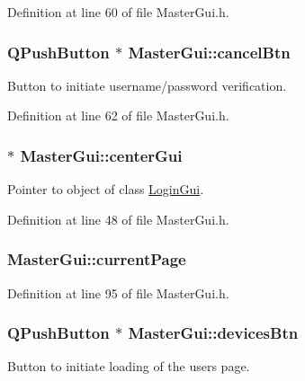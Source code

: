 Definition at line 60 of file Master\-Gui.\-h.

\hypertarget{class_master_gui_a9203da9daf3fa1294c744bc7fa645115}{
\subsubsection[{cancel\-Btn}]{\setlength{\rightskip}{0pt plus 5cm}Q\-Push\-Button $\ast$ Master\-Gui\-::cancel\-Btn\hspace{0.3cm}{\ttfamily [private]}}}\label{class_master_gui_a9203da9daf3fa1294c744bc7fa645115}
Button to initiate username/password verification. 

Definition at line 62 of file Master\-Gui.\-h.

\hypertarget{class_master_gui_ab23b51673ab5ab0ff0310060491c1865}{
\subsubsection[{center\-Gui}]{ $\ast$ Master\-Gui\-::center\-Gui\hspace{0.3cm}{\ttfamily [private]}}}\label{class_master_gui_ab23b51673ab5ab0ff0310060491c1865}
Pointer to object of class \hyperlink{class_login_gui}{Login\-Gui}. 

Definition at line 48 of file Master\-Gui.\-h.

\hypertarget{class_master_gui_a6f8f7e9a34c58c739f527c80ce42fcac}{
\subsubsection[{current\-Page}]{ Master\-Gui\-::current\-Page\hspace{0.3cm}{\ttfamily [private]}}}\label{class_master_gui_a6f8f7e9a34c58c739f527c80ce42fcac}


Definition at line 95 of file Master\-Gui.\-h.

\hypertarget{class_master_gui_aca061165f3d6014b7c95052a1bf861f1}{
\subsubsection[{devices\-Btn}]{\setlength{\rightskip}{0pt plus 5cm}Q\-Push\-Button $\ast$ Master\-Gui\-::devices\-Btn\hspace{0.3cm}{\ttfamily [private]}}}\label{class_master_gui_aca061165f3d6014b7c95052a1bf861f1}
Button to initiate loading of the users page. 

